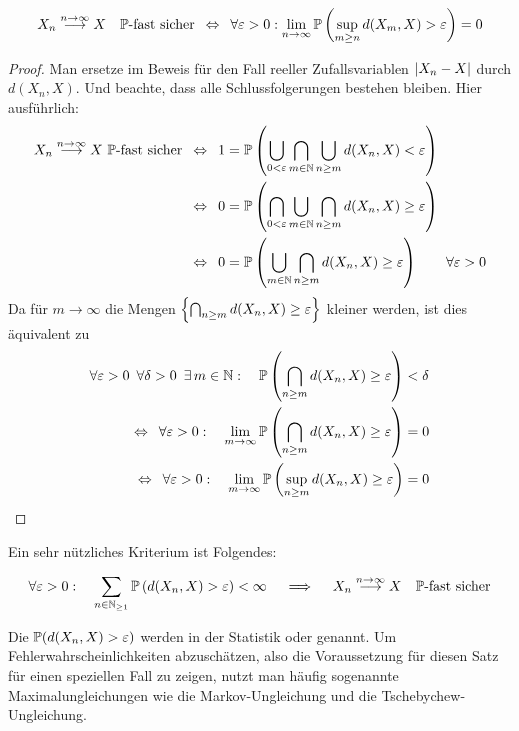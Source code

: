 \begin{satz}\label{satz: 3.9}
	\begin{equation*}
		X_n \ntoinf X \quad \P\text{-fast sicher}
		\equivalent
		\forall\epsilon > 0: \lim_{n \to \infty} \P\brackets{\sup_{m\ge n} d(X_m,X) > \epsilon} = 0
	\end{equation*}
\end{satz}
\begin{proof}
	Man ersetze im Beweis für den Fall reeller Zufallsvariablen $\abs{X_n-X}$ durch $d(X_n,X)$.
	Und beachte, dass alle Schlussfolgerungen bestehen bleiben. Hier ausführlich:
	\begin{align*}
		X_n \overset{n\to \infty}{\longrightarrow} X~\P \text{-fast sicher}
		&\equivalent 1 = \P\brackets{\bigcup_{0 < \epsilon} \bigcap_{m  \in  \N} \bigcup_{n \ge m} d(X_n, X) < \epsilon} \\
		&\equivalent 0 = \P\brackets{\bigcap_{0 < \epsilon} \bigcup_{m  \in  \N} \bigcap_{n \ge m} d(X_n, X) \ge \epsilon} \\
		&\equivalent 0 = \P\brackets{\bigcup_{m  \in  \N} \bigcap_{n \ge m} d(X_n, X) \ge \epsilon} \qquad \forall \epsilon > 0
	\end{align*}
	Da für $m \to  \infty$ die Mengen $\menge{\bigcap_{n \ge m} d(X_n, X) \ge \epsilon}$ kleiner werden,
	ist dies äquivalent zu
	\begin{align*}
		\forall \epsilon > 0 \enskip \forall \delta > 0 \enskip \exists\, m  \in \N: \quad \P\brackets{\bigcap_{n \ge m} d(X_n, X) \ge \epsilon} &< \delta \\
		\equivalent \forall \epsilon > 0: \quad \lim_{m \to  \infty} \P\brackets{\bigcap_{n \ge m} d(X_n, X) \ge \epsilon} &= 0 \\
		\equivalent \forall \epsilon > 0: \quad \lim_{m \to  \infty} \P\brackets{\sup_{n \ge m} d(X_n, X) \ge \epsilon} &= 0
	\end{align*}
\end{proof}

Ein sehr nützliches Kriterium ist Folgendes:
\begin{satz}\label{satz: 3.10}
	\begin{align*}
		\forall \epsilon > 0: \quad 
		\sum_{n \in \N_{\ge1}}\P\brackets{d(X_n,X)>\epsilon} < \infty
		\quad \implies \quad  X_n \ntoinf X \quad \P\text{-fast sicher}
	\end{align*}
\end{satz}
\begin{*bemerkung}
	Die $\P(d(X_n, X) > \epsilon)$ werden in der Statistik  oder  genannt.
	Um Fehlerwahrscheinlichkeiten abzuschätzen, also die Voraussetzung für diesen Satz für einen speziellen Fall zu zeigen, nutzt man häufig sogenannte Maximalungleichungen wie die Markov-Ungleichung und die Tschebychew-Ungleichung.
\end{*bemerkung}

